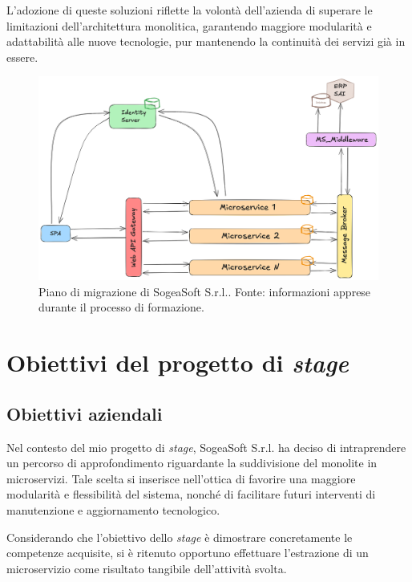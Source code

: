         \vspace{0.2 em}
        \noindent L'adozione di queste soluzioni riflette la volontà dell'azienda di superare le limitazioni dell'architettura monolitica, garantendo maggiore modularità e adattabilità alle nuove tecnologie, pur mantenendo la continuità dei servizi già in essere.

        \begin{figure}[H]
            \centering
            \includegraphics[width=1.0\linewidth]{BCS-Tessi/images/migrazione.png}
            \caption[Piano di migrazione di SogeaSoft S.r.l.]{Piano di migrazione di SogeaSoft S.r.l.. Fonte: informazioni apprese durante il processo di formazione. }
            \label{fig:migrazione}
        \end{figure}
        
    \section{Obiettivi del progetto di \textit{stage}}
        \subsection{Obiettivi aziendali}
        Nel contesto del mio progetto di \textit{stage}, SogeaSoft S.r.l. ha deciso di intraprendere un percorso di approfondimento riguardante la suddivisione del monolite in microservizi. Tale scelta si inserisce nell'ottica di favorire una maggiore modularità e flessibilità del sistema, nonché di facilitare futuri interventi di manutenzione e aggiornamento tecnologico.  

        \vspace{0.2 em}
        \noindent Considerando che l’obiettivo dello \textit{stage} è dimostrare concretamente le competenze acquisite, si è ritenuto opportuno effettuare l’estrazione di un microservizio come risultato tangibile dell’attività svolta. 

